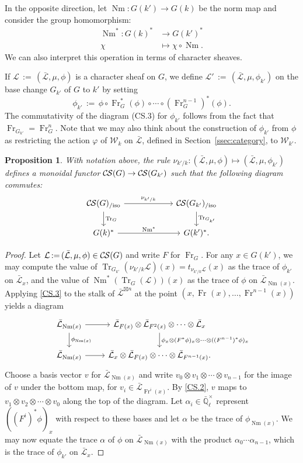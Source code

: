 \documentclass[10pt]{amsart}
\theoremstyle{plain}
\newtheorem{proposition}[theorem]{Proposition}
\theoremstyle{definition}
\newcommand{\EE}{\mathbb{\bar Q}_\ell}
\newcommand{\EEx}{\EE^\times}
\newcommand{\Weil}[1]{\mathcal{W}_{#1}}
\newcommand{\Frob}[1]{\operatorname{Fr}_{#1}}
\DeclareMathOperator{\Nm}{Nm}
\newcommand{\ceq}{{\, :=\, }}
\newcommand{\TrFrob}[1]{\operatorname{Tr}_{#1}}
\newcommand{\cs}[1]{{\mathcal{#1}}}
\newcommand{\gcs}[1]{{\mathcal{\bar #1}}}
\newcommand{\CS}{{\mathcal{C\hskip-0.8pt S}}}
\newcommand{\CSiso}[1]{\CS(#1)_{/\text{iso}}}
\begin{document}
In the opposite direction, let $\Nm : G(k') \to G(k)$ be the norm map and consider the group homomorphism:
\begin{align*}
\Nm^* : G(k)^* &\to G(k')^* \\
\chi &\mapsto \chi\circ \Nm.
\end{align*}
We can also interpret this operation in terms of character sheaves.

If $\cs{L} \ceq (\gcs{L}, \mu, \phi)$ is a character sheaf on $G$, we define
$\cs{L}' \ceq (\gcs{L}, \mu, \phi_{k'})$ on the base change
$G_{k'}$ of $G$ to $k'$ by setting
\[
\phi_{k'} \ceq \phi \circ \Frob{G}^*(\phi) \circ \cdots \circ (\Frob{G}^{n-1})^*(\phi).
\]
The commutativity of the diagram (CS.3) for $\phi_{k'}$
follows from the fact that $\Frob{G_{k'}} = \Frob{G}^n$.
Note that we may also think about the construction of $\phi_{k'}$ from $\phi$
as restricting the action $\varphi$ of $\Weil{k}$ on $\gcs{L}$,
defined in Section~\ref{ssec:category}, to $\Weil{k'}$.

\begin{proposition}\label{prop:basechange}
With notation above,
the rule $\nu_{k'/k}: (\gcs{L}, \mu, \phi) \mapsto (\gcs{L}, \mu, \phi_{k'})$
 defines a monoidal functor $\CS(G) \to \CS(G_{k'})$
 such that the following diagram commutes:
\[
\begin{tikzcd}[column sep=60]
\CSiso{G} \rar{\nu_{k'/k}} \dar{\TrFrob{G}} & \CSiso{G_{k'}} \dar{\TrFrob{G_{k'}}} \\
G(k)^*  \rar{\Nm^*} & G(k')^*.
\end{tikzcd}
\]
\end{proposition}

\begin{proof}
Let $\cs{L} \ceq (\gcs{L}, \mu, \phi) \in \CS(G)$ and write $F$ for $\Frob{G}$.  For any $x \in G(k')$,
we may compute the value of $\TrFrob{G_{k'}}(\nu_{k'/k}\cs{L})(x)= t_{\nu_{k'/k}\cs{L}}(x)$ as the trace of $\phi_{k'}$ on $\gcs{L}_x$,
and the value of $\Nm^*(\TrFrob{G}(\cs{L}))(x)$ as the trace of $\phi$ on $\gcs{L}_{\Nm(x)}$.
Applying \ref{CS.3} to the stalk of $\gcs{L}^{\boxtimes n}$ at the point $(x, \Frob{}(x), \ldots, \Frob{}^{n-1}(x))$ yields a diagram
\[
\begin{tikzcd}
\gcs{L}_{\Nm(x)} \rar \dar{\phi_{\Nm(x)}} & \gcs{L}_{F(x)} \otimes \gcs{L}_{F^2(x)} \otimes \cdots \otimes \gcs{L}_x
\dar{\phi_x \otimes (F^*\phi)_x \otimes \cdots \otimes ((F^{n-1})^*\phi)_x} \\
\gcs{L}_{\Nm(x)} \rar & \gcs{L}_x \otimes \gcs{L}_{F(x)} \otimes \cdots \otimes \gcs{L}_{F^{n-1}(x)}.
\end{tikzcd}
\]
Choose a basis vector $v$ for $\gcs{L}_{\Nm(x)}$ and write $v_0 \otimes v_1 \otimes \cdots \otimes v_{n-1}$ for the image of $v$ under the
bottom map,
for $v_i \in \gcs{L}_{\Frob{}^i(x)}$.  By \ref{CS.2}, $v$ maps to
$v_1 \otimes v_2 \otimes \cdots \otimes v_0$ along the top of the diagram.
Let $\alpha_i \in \EEx$ represent $((F^i)^*\phi)_x$ with respect to these bases and let $\alpha$ be
the trace of $\phi_{\Nm(x)}$.  We may now equate the trace $\alpha$ of $\phi$ on $\gcs{L}_{\Nm(x)}$
with the product $\alpha_0 \cdots \alpha_{n-1}$, which is the trace of $\phi_{k'}$ on $\gcs{L}_x$.
\end{proof}
\end{document}
